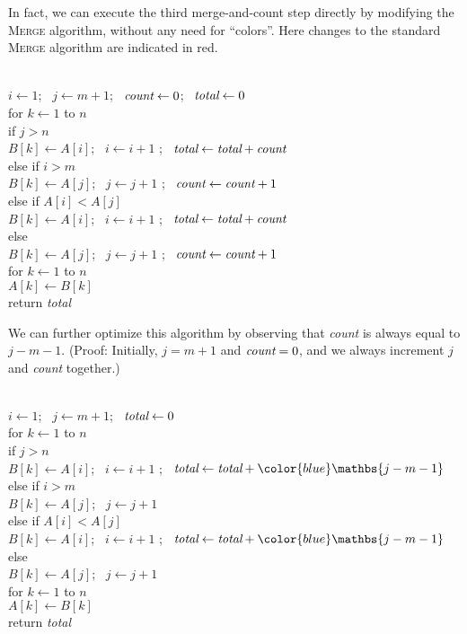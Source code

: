 \documentclass[11pt]{article}
\begin{document}
\begin{enumerate}
\begin{solution}
In fact, we can execute the third merge-and-count step directly by modifying the \textsc{Merge} algorithm, without any need for “colors”.  Here changes to the standard \textsc{Merge} algorithm are indicated in red.
\begin{algo}
	\+
\\	$i\gets 1$;~ $j\gets m+1$\color{Red};~
	$\emph{count} \gets 0$;~ $\emph{total} \gets 0$
\\[0.5ex]
	for $k\gets 1$ to $n$\+
\\	    if $j > n$ \+
\\			$B[k] \gets A[i]$;~ $i\gets i+1$\color{Red} ;~
			$\emph{total} \gets \emph{total} + \emph{count}$\-
\\	    else if $i > m$ \+
\\			$B[k] \gets A[j]$;~ $j\gets j+1$\color{Red} ;~
			$\emph{count} \gets \emph{count} + 1$\-
\\	    else if $A[i] < A[j]$ \+
\\			$B[k] \gets A[i]$;~ $i\gets i+1$\color{Red} ;~
			$\emph{total} \gets \emph{total} + \emph{count}$\-
\\	    else \+
\\			$B[k] \gets A[j]$;~ $j\gets j+1$\color{Red} ;~
			$\emph{count} \gets \emph{count} + 1$\-\-
\\[0.5ex]
	for $k\gets 1$ to $n$\+
\\	    $A[k]\gets B[k]$\-
\\	\color{Red} return \emph{total}
\end{algo}

We can further optimize this algorithm by observing that \emph{count} is always equal to $j-m-1$.  (Proof: Initially, $j=m+1$ and $\emph{count} = 0$, and we always increment $j$ and \emph{count} together.)
\begin{algo}
	\+
\\	$i\gets 1$;~ $j\gets m+1$\color{Red};~
	$\emph{total} \gets 0$
\\[0.5ex]
	for $k\gets 1$ to $n$\+
\\	    if $j > n$ \+
\\			$B[k] \gets A[i]$;~ $i\gets i+1$\color{Red} ;~
			$\emph{total} \gets \emph{total} + \color{blue}\mathbs{j-m-1}$\-
\\	    else if $i > m$ \+
\\			$B[k] \gets A[j]$;~ $j\gets j+1$\-
\\	    else if $A[i] < A[j]$ \+
\\			$B[k] \gets A[i]$;~ $i\gets i+1$\color{Red} ;~
			$\emph{total} \gets \emph{total} + \color{blue}\mathbs{j-m-1}$\-
\\	    else \+
\\			$B[k] \gets A[j]$;~ $j\gets j+1$\-\-
\\[0.5ex]
	for $k\gets 1$ to $n$\+
\\	    $A[k]\gets B[k]$\-
\\	\color{Red} return \emph{total}
\end{algo}


\end{solution}
\end{enumerate}
\end{document}
